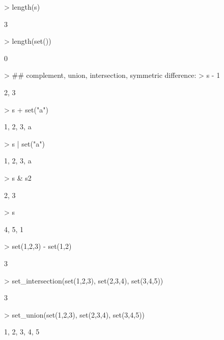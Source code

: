 \documentclass[fleqn]{article}
\begin{document}
\begin{Schunk}
\begin{Sinput}
> length(s)
\end{Sinput}
\begin{Soutput}
[1] 3
\end{Soutput}
\begin{Sinput}
> length(set())
\end{Sinput}
\begin{Soutput}
[1] 0
\end{Soutput}
\begin{Sinput}
> ## complement, union, intersection, symmetric difference:
> s - 1
\end{Sinput}
\begin{Soutput}
{2, 3}
\end{Soutput}
\begin{Sinput}
> s + set("a")
\end{Sinput}
\begin{Soutput}
{1, 2, 3, a}
\end{Soutput}
\begin{Sinput}
> s | set("a")
\end{Sinput}
\begin{Soutput}
{1, 2, 3, a}
\end{Soutput}
\begin{Sinput}
> s & s2
\end{Sinput}
\begin{Soutput}
{2, 3}
\end{Soutput}
\begin{Sinput}
> s %D% s2
\end{Sinput}
\begin{Soutput}
{4, 5, 1}
\end{Soutput}
\begin{Sinput}
> set(1,2,3) - set(1,2)
\end{Sinput}
\begin{Soutput}
{3}
\end{Soutput}
\begin{Sinput}
> set_intersection(set(1,2,3), set(2,3,4), set(3,4,5))
\end{Sinput}
\begin{Soutput}
{3}
\end{Soutput}
\begin{Sinput}
> set_union(set(1,2,3), set(2,3,4), set(3,4,5))
\end{Sinput}
\begin{Soutput}
{1, 2, 3, 4, 5}
\end{Soutput}
\begin{Sinput}

\end{Sinput}
\end{Schunk}
\end{document}
